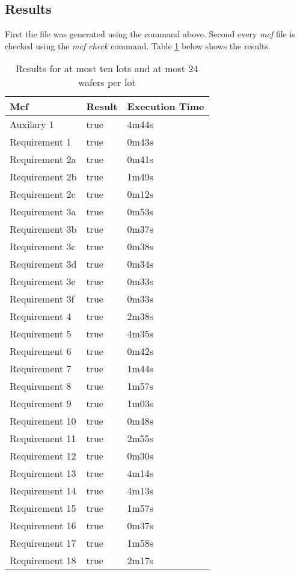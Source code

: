 \subsection{Results}
First the  file was generated using the  command above. Second every \textit{mcf} file is checked using the \textit{mcf check} command.
Table \ref{tab:results1024} below shows the results.
\begin{table}[!hb]
    \centering
    \begin{tabular}{|l|l|l|}
        \hline
        \textbf{Mcf} & \textbf{Result} & \textbf{Execution Time} \\ \hline
			Auxilary 1 & true & 4m44s \\ \hline
			Requirement 1 & true & 0m43s \\ \hline
			Requirement 2a & true & 0m41s \\ \hline
			Requirement 2b & true & 1m49s \\ \hline
			Requirement 2c & true & 0m12s \\ \hline
			Requirement 3a & true & 0m53s \\ \hline
			Requirement 3b & true & 0m37s \\ \hline
			Requirement 3c & true & 0m38s \\ \hline
			Requirement 3d & true & 0m34s \\ \hline
			Requirement 3e & true & 0m33s \\ \hline
			Requirement 3f & true & 0m33s \\ \hline
			Requirement 4 & true & 2m38s \\ \hline
			Requirement 5 & true & 4m35s \\ \hline
			Requirement 6 & true & 0m42s \\ \hline
			Requirement 7 & true & 1m44s \\ \hline
			Requirement 8 & true & 1m57s \\ \hline
			Requirement 9 & true & 1m03s \\ \hline
			Requirement 10 & true & 0m48s \\ \hline
			Requirement 11 & true & 2m55s \\ \hline
			Requirement 12 & true & 0m30s \\ \hline
			Requirement 13 & true & 4m14s \\ \hline
			Requirement 14 & true & 4m13s \\ \hline
			Requirement 15 & true & 1m57s \\ \hline
			Requirement 16 & true & 0m37s \\ \hline
			Requirement 17 & true & 1m58s \\ \hline
			Requirement 18 & true & 2m17s \\ \hline
    \end{tabular}
    \caption{Results for at most ten lots and at most 24 wafers per lot}
    \label{tab:results1024}
\end{table}
